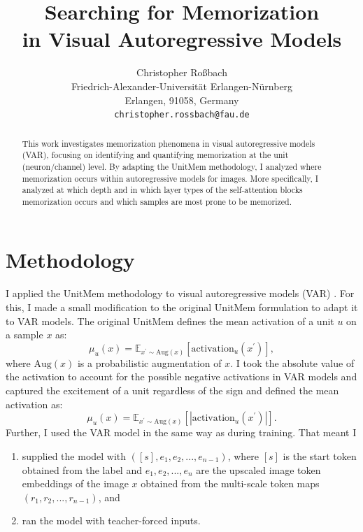 \documentclass{article} %
\title{Searching for Memorization\\in Visual Autoregressive Models}
\author{Christopher Roßbach\\
Friedrich-Alexander-Universität Erlangen-Nürnberg \\
Erlangen, 91058, Germany \\
\texttt{christopher.rossbach@fau.de}}
\begin{document}
\maketitle

\begin{abstract}
This work investigates memorization phenomena in visual autoregressive models (VAR), focusing on identifying and quantifying memorization at the unit (neuron/channel) level.
By adapting the UnitMem methodology, I analyzed where memorization occurs within autoregressive models for images.
More specifically, I analyzed at which depth and in which layer types of the self-attention blocks memorization occurs and which samples are most prone to be memorized.
\end{abstract}
\section{Methodology}
I applied the UnitMem methodology \citep{wangLocalizingMemorizationSSL2024} to visual autoregressive models (VAR) \citep{tianVisualAutoregressiveModeling2024}.
For this, I made a small modification to the original UnitMem formulation to adapt it to VAR models.
The original UnitMem defines the mean activation of a unit $u$ on a sample $x$ as:
\begin{equation}
    \mu_u(x) = \mathbb{E}_{x^\prime\sim\text{Aug}(x)}[\text{activation}_u(x^\prime)],
\end{equation}
where $\text{Aug}(x)$ is a probabilistic augmentation of $x$.
I took the absolute value of the activation to account for the possible negative activations in VAR models and captured the excitement of a unit regardless of the sign and defined the mean activation as:
\begin{equation}
   \label{eq:activation_mean}
    \mu_u(x) = \mathbb{E}_{x^\prime\sim\text{Aug}(x)}[|\text{activation}_u(x^\prime)|].
\end{equation}
Further, I used the VAR model in the same way as during training.
That meant I
\begin{enumerate}
   \item supplied the model with $([s], e_1, e_2, ..., e_{n-1})$, where $[s]$ is the start token obtained from the label and $e_1, e_2, ..., e_{n}$ are the upscaled image token embeddings of the image $x$ obtained from the multi-scale token maps $(r_1, r_2, ..., r_{n-1})$, and
   \item ran the model with teacher-forced inputs.
\end{enumerate}
\end{document}
